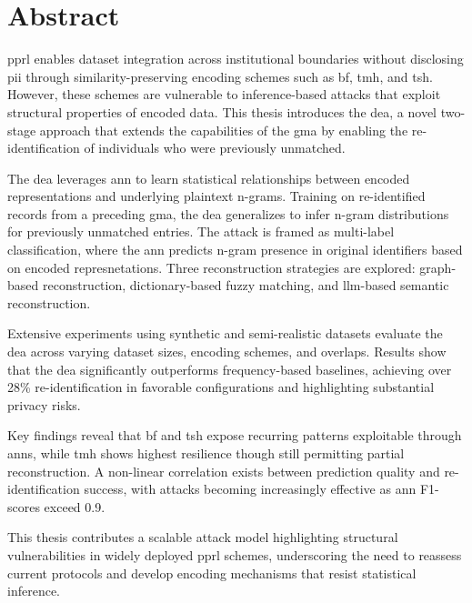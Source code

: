

\chapter{Abstract}

\ac{pprl} enables dataset integration across institutional boundaries without disclosing \ac{pii} through similarity-preserving encoding schemes such as \ac{bf}, \ac{tmh}, and \ac{tsh}.
However, these schemes are vulnerable to inference-based attacks that exploit structural properties of encoded data.
This thesis introduces the \ac{dea}, a novel two-stage approach that extends the capabilities of the \ac{gma} by enabling the re-identification of individuals who were previously unmatched.

The \ac{dea} leverages \ac{ann} to learn statistical relationships between encoded representations and underlying plaintext n-grams.
Training on re-identified records from a preceding \ac{gma}, the \ac{dea} generalizes to infer n-gram distributions for previously unmatched entries.
The attack is framed as multi-label classification, where the \ac{ann} predicts n-gram presence in original identifiers based on encoded represnetations.
Three reconstruction strategies are explored: graph-based reconstruction, dictionary-based fuzzy matching, and \ac{llm}-based semantic reconstruction.

Extensive experiments using synthetic and semi-realistic datasets evaluate the \ac{dea} across varying dataset sizes, encoding schemes, and overlaps.
Results show that the \ac{dea} significantly outperforms frequency-based baselines, achieving over 28\% re-identification in favorable configurations and highlighting substantial privacy risks.

Key findings reveal that \ac{bf} and \ac{tsh} expose recurring patterns exploitable through \ac{ann}s, while \ac{tmh} shows highest resilience though still permitting partial reconstruction.
A non-linear correlation exists between prediction quality and re-identification success, with attacks becoming increasingly effective as \ac{ann} F1-scores exceed 0.9.

This thesis contributes a scalable attack model highlighting structural vulnerabilities in widely deployed \ac{pprl} schemes, underscoring the need to reassess current protocols and develop encoding mechanisms that resist statistical inference.
